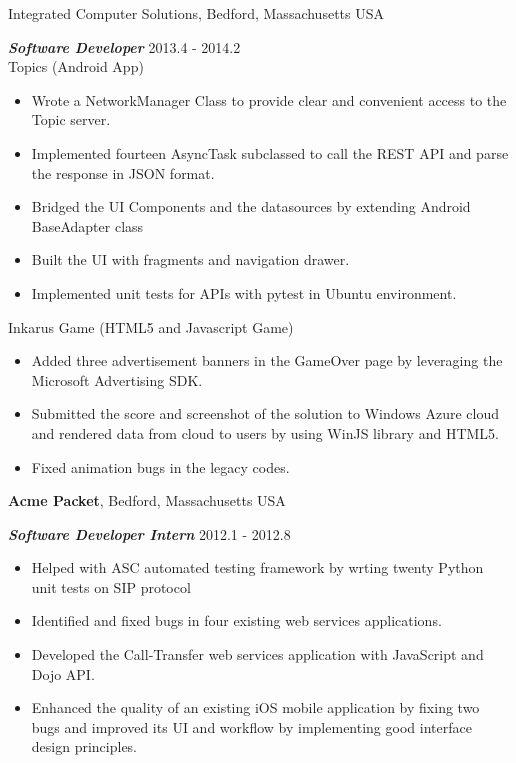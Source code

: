 \documentclass[margin,line]{res}
\begin{document}
\begin{resume}
{Integrated Computer Solutions}, Bedford, Massachusetts USA

\vspace{-.3cm}
{\em {\bf Software Developer}} \hfill {2013.4 - 2014.2}\\
Topics (Android App)
\begin{itemize}
\item Wrote a NetworkManager Class to provide clear and convenient access to the Topic server.
\item Implemented fourteen AsyncTask subclassed to call the REST API and parse the response
in JSON format.
\item Bridged the UI Components and the datasources by extending Android BaseAdapter class
\item Built the UI with fragments and navigation drawer.
\item Implemented unit tests for APIs with pytest in Ubuntu environment.
\end{itemize}

Inkarus Game (HTML5 and Javascript Game)
\begin{itemize}
\item Added three advertisement banners in the GameOver page by leveraging 
the Microsoft Advertising SDK.
\item Submitted the score and screenshot of the solution to Windows Azure cloud
and rendered data from cloud to users by using WinJS library and HTML5.
\item Fixed animation bugs in the legacy codes.
\end{itemize}

{\bf Acme Packet}, Bedford, Massachusetts USA

\vspace{-.3cm}
{\em \bf {Software Developer Intern}} \hfill {2012.1 - 2012.8}\\
\begin{itemize}
\item Helped with ASC automated testing framework by wrting twenty Python unit tests on SIP protocol
\item Identified and fixed bugs in four existing web services applications.
\item Developed the Call-Transfer web services application with JavaScript and Dojo API.
\item Enhanced the quality of an existing iOS mobile application by fixing two bugs and improved its UI and workflow by implementing good interface design principles.
\end{itemize}


\end{resume}
\end{document}
